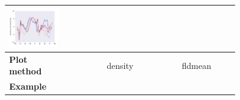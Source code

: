 \documentclass[
11pt, %
english, %
singlespacing, %
headsepline, %
]{MastersDoctoralThesis} %
\begin{document}
\begin{NoHyper}
\begin{refsection}
\begin{subappendices}
\begin{tabular}[c]{l|p{0.25\linewidth}|p{0.25\linewidth}|p{0.25\linewidth}|}
				\includegraphics[width=\linewidth, page=9]{psyplot-figures/psy-simple-demo.pdf} \\
			\midrule
			\midrule
			\textbf{Plot method} & \multicolumn{2}{c|}{density} & {\centering fldmean}  \\
			\hline
			\textbf{Example} & 

\end{tabular}
\end{subappendices}
\end{refsection}
\end{NoHyper}
\end{document}
